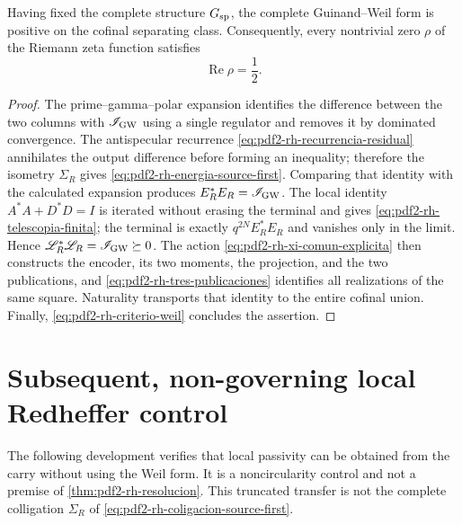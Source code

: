 \begin{theorem}
\label{thm:pdf2-rh-resolucion}
Having fixed the complete structure
\(\mathfrak G_{\rm sp}\), the complete
Guinand--Weil form is positive on the cofinal separating class. Consequently,
every nontrivial zero \(\rho\) of the Riemann zeta function
satisfies
\[
 \boxed{\operatorname{Re}\rho=\frac12.}
\]
\end{theorem}

\begin{proof}
The prime--gamma--polar expansion identifies the difference between the two columns
with \(\mathscr I_{\rm GW}\) using a single regulator and removes it by
dominated convergence. The antispecular recurrence
\eqref{eq:pdf2-rh-recurrencia-residual} annihilates the output difference before
forming an inequality; therefore the isometry \(\Sigma_R\) gives
\eqref{eq:pdf2-rh-energia-source-first}. Comparing that identity with the
calculated expansion produces
\(E_R^*E_R=\mathscr I_{\rm GW}\). The local identity
\(A^*A+D^*D=I\) is iterated without erasing the terminal and gives
\eqref{eq:pdf2-rh-telescopia-finita}; the terminal is exactly
\(q^{2N}E_R^*E_R\) and vanishes only in the limit. Hence
\(\mathscr L_R^*\mathscr L_R=\mathscr I_{\rm GW}\succeq0\).
The action
\eqref{eq:pdf2-rh-xi-comun-explicita} then constructs the encoder, its
two moments, the projection, and the two publications, and
\eqref{eq:pdf2-rh-tres-publicaciones} identifies all realizations of the
same square. Naturality transports that identity to the entire cofinal
union. Finally,
\eqref{eq:pdf2-rh-criterio-weil} concludes the assertion.
\end{proof}

\section{Subsequent, non-governing local Redheffer control}

The following development verifies that local passivity can be obtained from
the carry without using the Weil form. It is a noncircularity control and not a
premise of \cref{thm:pdf2-rh-resolucion}. This truncated transfer is not
the complete colligation \(\Sigma_R\) of
\eqref{eq:pdf2-rh-coligacion-source-first}.

